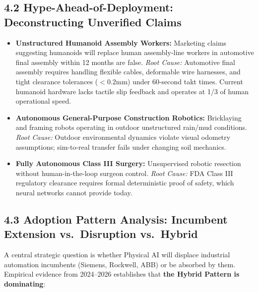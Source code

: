 \documentclass[11pt,a4paper]{article}
\begin{document}
\subsection{4.2 Hype-Ahead-of-Deployment: Deconstructing Unverified Claims}
\begin{itemize}
    \item \textbf{Unstructured Humanoid Assembly Workers:} Marketing claims suggesting humanoids will replace human assembly-line workers in automotive final assembly within 12 months are false. \textit{Root Cause:} Automotive final assembly requires handling flexible cables, deformable wire harnesses, and tight clearance tolerances ($<0.2\text{mm}$) under 60-second takt times. Current humanoid hardware lacks tactile slip feedback and operates at 1/3 of human operational speed.
    \item \textbf{Autonomous General-Purpose Construction Robotics:} Bricklaying and framing robots operating in outdoor unstructured rain/mud conditions. \textit{Root Cause:} Outdoor environmental dynamics violate visual odometry assumptions; sim-to-real transfer fails under changing soil mechanics.
    \item \textbf{Fully Autonomous Class III Surgery:} Unsupervised robotic resection without human-in-the-loop surgeon control. \textit{Root Cause:} FDA Class III regulatory clearance requires formal deterministic proof of safety, which neural networks cannot provide today.
\end{itemize}

\subsection{4.3 Adoption Pattern Analysis: Incumbent Extension vs.\ Disruption vs.\ Hybrid}
A central strategic question is whether Physical AI will displace industrial automation incumbents (Siemens, Rockwell, ABB) or be absorbed by them. Empirical evidence from 2024--2026 establishes that \textbf{the Hybrid Pattern is dominating}:
\end{document}
